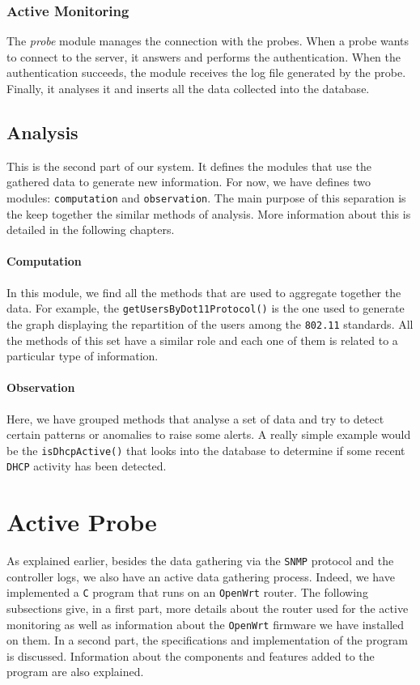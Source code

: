 \subsubsection{Active Monitoring}
The \emph{probe} module manages the connection with the probes. When a probe wants to connect to the server, it answers and performs the authentication. When the authentication succeeds, the module receives the log file generated by the probe. Finally, it analyses it and inserts all the data collected into the database.

\subsection{Analysis}
This is the second part of our system. It defines the modules that use the gathered data to generate new information. For now, we have defines two modules: \texttt{computation} and \texttt{observation}. The main purpose of this separation is the keep together the similar methods of analysis. More information about this is detailed in the following chapters.

\paragraph*{Computation} In this module, we find all the methods that are used to aggregate together the data. For example, the \texttt{getUsersByDot11Protocol()} is the one used to generate the graph displaying the repartition of the users among the \texttt{802.11} standards. All the methods of this set have a similar role and each one of them is related to a particular type of information.

\paragraph*{Observation} Here, we have grouped methods that analyse a set of data and try to detect certain patterns or anomalies to raise some alerts. A really simple example would be the \texttt{isDhcpActive()} that looks into the database to determine if some recent \texttt{DHCP} activity has been detected.


\section{Active Probe}
As explained earlier, besides the data gathering via the \texttt{SNMP} protocol and the controller logs, we also have an active data gathering process. Indeed, we have implemented a \texttt{C} program that runs on an \texttt{OpenWrt} router. The following subsections give, in a first part, more details about the router used for the active monitoring as well as information about the \texttt{OpenWrt} firmware we have installed on them. In a second part, the specifications and implementation of the program is discussed. Information about the components and features added to the program are also explained.\\


